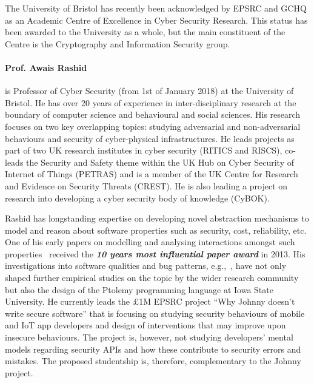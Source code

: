 \documentclass[10pt]{article}
\begin{document}
The University of Bristol has recently been acknowledged by 
EPSRC and GCHQ as an Academic Centre of Excellence in Cyber Security
Research. This status has been awarded to the University as a whole,
but the main constituent of the Centre is the Cryptography and Information
Security group.
\fi


\paragraph{Prof. Awais Rashid} is Professor of Cyber Security (from 1st of January 2018) at the University of Bristol. He has over 20 years of experience in inter-disciplinary research at the boundary of computer science and behavioural and social sciences. His research focuses on two key overlapping topics: studying adversarial and non-adversarial behaviours and security of cyber-physical infrastructures. He leads projects as part of two UK research institutes in cyber security (RITICS and RISCS), co-leads the Security and Safety theme within the UK Hub on Cyber Security of Internet of Things (PETRAS) and is a member of the UK Centre for Research and Evidence on Security Threats (CREST). He is also leading a project on research into developing a cyber security body of knowledge (CyBOK).

Rashid has longstanding expertise on developing novel abstraction mechanisms to model and reason about software properties such as security, cost, reliability, etc. One of his early papers on modelling and analysing interactions amongst such properties~\cite{rashid2003} received the \textit{\textbf{10 years most influential paper award}} in 2013. His investigations into software qualities and bug patterns, e.g.,~\cite{greenwood2007, coelho2008}, have not only shaped further empirical studies on the topic by the wider research community but also the design of the Ptolemy programming language at Iowa State University. He currently leads the \pounds1M EPSRC project ``Why Johnny doesn't write secure software'' that is focusing on studying security behaviours of mobile and IoT app developers and design of interventions that may improve upon insecure behaviours. The project is, however, not studying developers' mental models regarding security APIs and how these contribute to security errors and mistakes. The proposed studentship is, therefore, complementary to the Johnny project.
\end{document}
